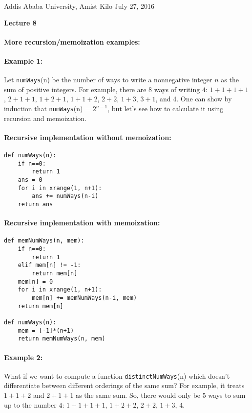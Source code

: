 \documentclass[11pt]{article}
\newlength{\toppush}
\newcommand{\htitle}[2]{\noindent\vspace*{-\toppush}\newline\parbox{6.5in}
 {\large Addis Ababa University, Amist Kilo \hfill #1\newline
\hspace*{\fill}{\bf Algorithms and Programming for High Schoolers} \hspace*{\fill} \newline
\mbox{}\hrulefill\mbox{}}\vspace*{1ex}\mbox{}\newline
\begin{center}{\Large\bf #2}\end{center}}
\begin{document}
\htitle{July 27, 2016}{Lecture 8}

\paragraph{\Large More recursion/memoization examples:}

\paragraph{Example 1:}
Let \texttt{numWays}(n) be the number of ways to write a nonnegative
integer $n$ as the sum of positive integers.  For example, there are 8
ways of writing $4$: $1+1+1+1$, $2+1+1$, $1+2+1$, $1+1+2$, $2+2$,
$1+3$, $3+1$, and $4$.  One can show by induction that
\texttt{numWays}(n) = $2^{n-1}$, but let's see how to calculate it
using recursion and memoization.

\paragraph{Recursive implementation without memoization:}
\begin{verbatim}
def numWays(n):
    if n==0:
        return 1
    ans = 0
    for i in xrange(1, n+1):
        ans += numWays(n-i)
    return ans
\end{verbatim}

\paragraph{Recursive implementation with memoization:}
\begin{verbatim}
def memNumWays(n, mem):
    if n==0:
        return 1
    elif mem[n] != -1:
        return mem[n]
    mem[n] = 0
    for i in xrange(1, n+1):
        mem[n] += memNumWays(n-i, mem)
    return mem[n]

def numWays(n):
    mem = [-1]*(n+1)
    return memNumWays(n, mem)
\end{verbatim}

\paragraph{Example 2:}
What if we want to compute a function \texttt{distinctNumWays}(n)
which doesn't differentiate between different orderings of the same
sum?  For example, it treats $1+1+2$ and $2+1+1$ as the same sum.  So,
there would only be $5$ ways to sum up to the number $4$: $1+1+1+1$,
$1+2+2$, $2+2$, $1+3$, $4$.
\end{document}
